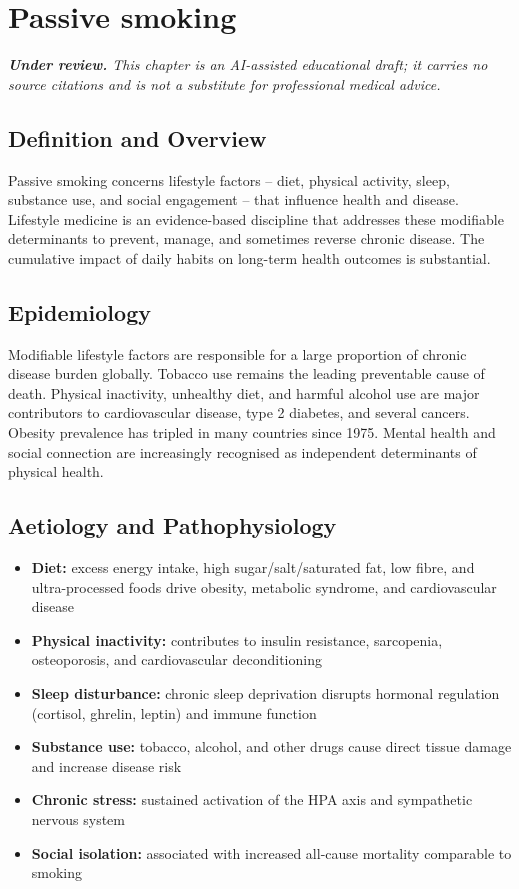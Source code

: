 \chapter{Passive smoking}

\medskip
\noindent\textit{\textbf{Under review.} This chapter is an AI-assisted educational draft; it carries no source citations and is not a substitute for professional medical advice.}

\section*{Definition and Overview}
Passive smoking concerns lifestyle factors -- diet, physical activity, sleep, substance use, and social engagement -- that influence health and disease. Lifestyle medicine is an evidence-based discipline that addresses these modifiable determinants to prevent, manage, and sometimes reverse chronic disease. The cumulative impact of daily habits on long-term health outcomes is substantial.

\section*{Epidemiology}
Modifiable lifestyle factors are responsible for a large proportion of chronic disease burden globally. Tobacco use remains the leading preventable cause of death. Physical inactivity, unhealthy diet, and harmful alcohol use are major contributors to cardiovascular disease, type 2 diabetes, and several cancers. Obesity prevalence has tripled in many countries since 1975. Mental health and social connection are increasingly recognised as independent determinants of physical health.

\section*{Aetiology and Pathophysiology}
\begin{itemize}
    \item \textbf{Diet:} excess energy intake, high sugar/salt/saturated fat, low fibre, and ultra-processed foods drive obesity, metabolic syndrome, and cardiovascular disease
    \item \textbf{Physical inactivity:} contributes to insulin resistance, sarcopenia, osteoporosis, and cardiovascular deconditioning
    \item \textbf{Sleep disturbance:} chronic sleep deprivation disrupts hormonal regulation (cortisol, ghrelin, leptin) and immune function
    \item \textbf{Substance use:} tobacco, alcohol, and other drugs cause direct tissue damage and increase disease risk
    \item \textbf{Chronic stress:} sustained activation of the HPA axis and sympathetic nervous system
    \item \textbf{Social isolation:} associated with increased all-cause mortality comparable to smoking
\end{itemize}

